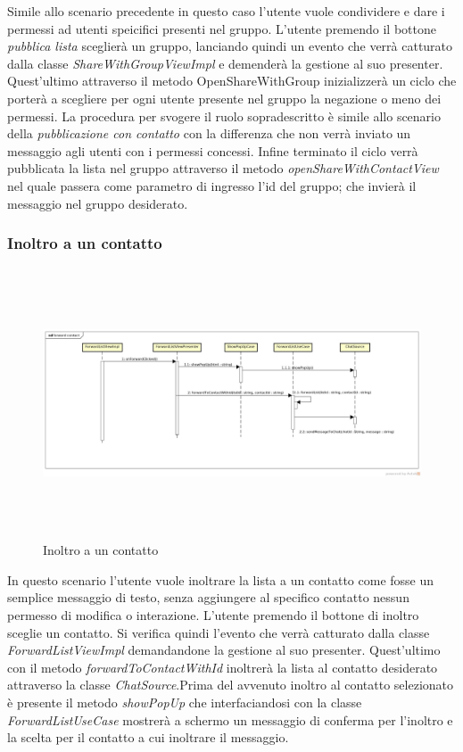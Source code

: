 Simile allo scenario precedente in questo caso l'utente vuole condividere e dare i permessi ad utenti speicifici presenti nel gruppo. L'utente premendo il bottone \textit{pubblica lista} sceglierà un gruppo, lanciando quindi un evento che verrà catturato dalla classe \textit{ShareWithGroupViewImpl}
\newpage e demenderà la gestione al suo presenter. Quest'ultimo attraverso il metodo OpenShareWithGroup inizializzerà un ciclo che porterà a scegliere per ogni utente presente nel gruppo la negazione o meno dei permessi. La procedura per svogere il ruolo sopradescritto è simile allo scenario della \textit{pubblicazione con contatto} con la differenza che non verrà inviato un messaggio agli utenti con i permessi concessi. Infine terminato il ciclo verrà pubblicata la lista nel gruppo attraverso il metodo \textit{openShareWithContactView} nel quale passera come parametro di ingresso l'id del gruppo; che invierà il messaggio nel gruppo desiderato.

\subsubsection{Inoltro a un contatto}

\label{Inoltro a un contatto}
\begin{figure}[H]
	\centering
	\includegraphics[width=12cm, height=8cm]{Sezioni/Diagrammi/img_app/forward_contatto.jpg}
	\caption{Inoltro a un contatto}
	
\end{figure}

In questo scenario l'utente vuole inoltrare la lista a un contatto come fosse un semplice messaggio di testo, senza aggiungere al specifico contatto nessun permesso di modifica o interazione. L'utente premendo il bottone di inoltro sceglie un contatto. Si verifica quindi l'evento che verrà catturato dalla classe \textit{ForwardListViewImpl} demandandone la gestione al suo presenter.
Quest'ultimo con il metodo \textit{forwardToContactWithId} inoltrerà la lista al contatto desiderato attraverso la classe \textit{ChatSource}.Prima del avvenuto inoltro al contatto selezionato è presente il metodo \textit{showPopUp} che interfaciandosi con la classe \textit{ForwardListUseCase} mostrerà a schermo un messaggio di conferma per l'inoltro e la scelta per il contatto a cui inoltrare il messaggio.



